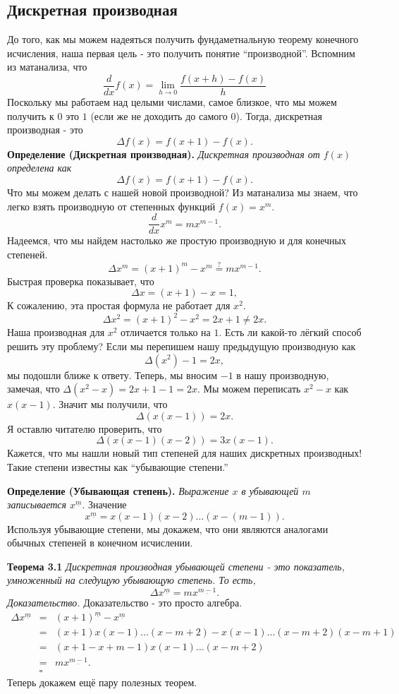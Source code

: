 \documentclass{article}
\newcommand{\ff}[1]{%
  ^{\underline{#1}}%
}
\begin{document}
\subsection{Дискретная производная}
До того, как мы можем надеяться получить фундаметнальную теорему конечного исчисления, наша первая цель - это получить понятие ``производной''. Вспомним из матанализа, что
$$\frac{d}{dx} f(x) = \lim_{h \to 0} \frac{f(x+h)-f(x)}{h}$$
Поскольку мы работаем над целыми числами, самое близкое, что мы можем получить к $0$ это $1$ (если же не доходить до самого $0$). Тогда, дискретная производная - это
$$ \Delta f(x)=f(x+1)-f(x).$$
\textbf{Определение (Дискретная производная).} \textit{Дискретная производная от $f(x)$ определена как}
$$ \Delta f(x)=f(x+1)-f(x).$$
Что мы можем делать с нашей новой производной? Из матанализа мы знаем, что легко взять производную от степенных функций $f(x)=x^m$.
$$\frac{d}{dx}x^m=mx^{m-1}.$$
Надеемся, что мы найдем настолько же простую производную и для конечных степеней.
$$\Delta x^m = (x+1)^m-x^m \stackrel{?}{=} mx^{m-1}.$$
Быстрая проверка показывает, что
$$\Delta x=(x+1)-x=1,$$
К сожалению, эта простая формула не работает для $x^2$.
$$\Delta x^2=(x+1)^2-x^2=2x+1 \neq 2x.$$
Наша производная для $x^2$ отличается только на $1$. Есть ли какой-то лёгкий способ решить эту проблему? Если мы перепишем нашу предыдущую производную как
$$\Delta (x^2)-1=2x,$$
мы подошли ближе к ответу. Теперь, мы вносим $-1$ в нашу производную, замечая, что $\Delta (x^2-x)=2x+1-1=2x.$ Мы можем переписать $x^2-x$ как $x(x-1)$. Значит мы получили, что
$$\Delta (x(x-1))=2x.$$
Я оставлю читателю проверить, что
$$\Delta (x(x-1)(x-2))=3x(x-1).$$
Кажется, что мы нашли новый тип степеней для наших дискретных производных! Такие степени известны как ``убывающие степени.''

\textbf{Определение (Убывающая степень).} \textit{Выражение $x$ в убывающей $m$ записывается $x\ff{m}$}. Значение
$$x\ff{m}=x(x-1)(x-2) \dots (x-(m-1)).$$
Используя убывающие степени, мы докажем, что они являются аналогами обычных степеней в конечном исчислении.

\textbf{Теорема 3.1} \textit{Дискретная производная убывающей степени -  это показатель, умноженный на следущую убывающую степень. То есть,}
$$\Delta x\ff{m}=mx\ff{m-1}.$$
\textit{Доказательство.} Доказательство - это просто алгебра.
\begin{eqnarray*}
\Delta x\ff{m} &=&(x+1)\ff{m}-x\ff{m} \\
& = & (x+1)x(x-1) \dots (x-m+2)-x(x-1) \dots (x-m+2)(x-m+1) \\
& = & (x+1-x+m-1)x(x-1) \dots (x-m+2) \\
& = & mx\ff{m-1}. \\
& \square
\end{eqnarray*}
Теперь докажем ещё пару полезных теорем.
\end{document}
